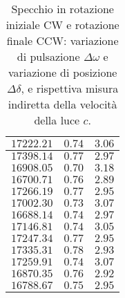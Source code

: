 \documentclass[]{article}
\begin{document}
\begin{table}
\begin{tabular}{||c|c|c||}
            $17222.21$ & $0.74$ & $3.06$ \\\hline
            $17398.14$ & $0.77$ & $2.97$ \\\hline
            $16908.05$ & $0.70$ & $3.18$ \\\hline
            $16700.71$ & $0.76$ & $2.89$ \\\hline
            $17266.19$ & $0.77$ & $2.95$ \\\hline
            $17002.30$ & $0.73$ & $3.07$ \\\hline
            $16688.14$ & $0.74$ & $2.97$ \\\hline
            $17146.81$ & $0.74$ & $3.05$ \\\hline
            $17247.34$ & $0.77$ & $2.95$ \\\hline
            $17335.31$ & $0.78$ & $2.93$ \\\hline
            $17259.91$ & $0.74$ & $3.07$ \\\hline
            $16870.35$ & $0.76$ & $2.92$ \\\hline
            $16788.67$ & $0.75$ & $2.95$ \\\hline
        \end{tabular}
        \caption{Specchio in rotazione iniziale CW e rotazione finale CCW: variazione di pulsazione $\Delta\omega$ e variazione di posizione $\Delta\delta$, e rispettiva misura indiretta della velocità della luce $c$.}
        \label{CW_CCW-c}
    \end{table}
\end{document}
